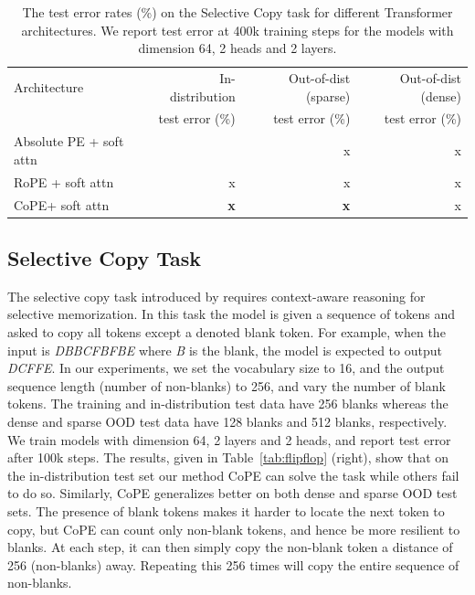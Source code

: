\documentclass{article}
\newcommand{\ours}{CoPE\xspace}
\begin{document}
\fi 

\begin{table}[t]
  \caption{The test error rates (\%) on the Selective Copy task for different Transformer architectures. We report test error at 400k training steps for the models with dimension 64, 2 heads and 2 layers.
  }
  \label{tab:selectivecopy}
  \centering
  \begin{tabular}{lrrr}
    \toprule
        Architecture   & In-distribution& Out-of-dist (sparse) &  Out-of-dist (dense)\\
          &   test error (\%) & test error (\%) & test error (\%) \\
    \midrule
    Absolute PE + soft attn &  & x &x\\
    RoPE + soft attn & x & x &x\\
    \midrule
    \ours + soft attn & \bf x & \bf x &x\\
    \bottomrule
  \end{tabular}
\end{table}
\fi 

\subsection{Selective Copy Task}
The selective copy task  introduced by \cite{gu2023mamba}
requires context-aware reasoning for selective memorization. In this task the model is given a sequence of tokens and asked to copy all tokens except a denoted blank token. For example, when the input is {\em DBBCFBFBE} where {\em B} is the blank, the model is expected to output {\em DCFFE}. In our experiments, we set the vocabulary size to 16, and  the output sequence length (number of non-blanks) to 256, and vary the number of blank tokens. The training and in-distribution test data have 256 blanks whereas
the dense and sparse OOD test data have 128 blanks and 512 blanks, respectively.
We train models with dimension 64, 2 layers and 2 heads, and report test error after 100k steps. The results, given in Table~\ref{tab:flipflop} (right),  show that on the in-distribution test set our method \ours can solve the task while others fail to do so. Similarly, \ours generalizes better on both dense and sparse OOD test sets.
The presence of blank tokens makes it harder to locate the next token to copy, but \ours{} can count only non-blank tokens, and hence be more resilient to blanks. At each step, it can then simply copy the non-blank token a distance of 256 (non-blanks) away. Repeating this 256 times will copy the entire sequence of non-blanks.
\end{document}
